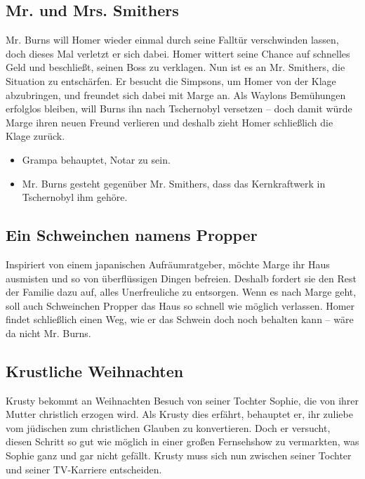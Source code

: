 \subsection{Mr. und Mrs. Smithers}\label{WABF03}
Mr. Burns will Homer wieder einmal durch seine Falltür verschwinden lassen, doch dieses Mal verletzt er sich dabei. Homer wittert seine Chance auf schnelles Geld und beschließt, seinen Boss zu verklagen. Nun ist es an Mr. Smithers, die Situation zu entschärfen. Er besucht die Simpsons, um Homer von der Klage abzubringen, und freundet sich dabei mit Marge an. Als Waylons Bemühungen erfolglos bleiben, will Burns ihn nach Tschernobyl versetzen -- doch damit würde Marge ihren neuen Freund verlieren und deshalb zieht Homer schließlich die Klage zurück.

\begin{itemize}
  \item Grampa behauptet, Notar zu sein.
  \item Mr. Burns gesteht gegenüber Mr. Smithers, dass das Kernkraftwerk in Tschernobyl ihm gehöre.
\end{itemize}

\subsection{Ein Schweinchen namens Propper}\label{WABF06}
Inspiriert von einem japanischen Aufräumratgeber, möchte Marge ihr Haus ausmisten und so von überflüssigen Dingen befreien. Deshalb fordert sie den Rest der Familie dazu auf, alles Unerfreuliche zu entsorgen. Wenn es nach Marge geht, soll auch Schweinchen Propper das Haus so schnell wie möglich verlassen. Homer findet schließlich einen Weg, wie er das Schwein doch noch behalten kann -- wäre da nicht Mr. Burns.


\subsection{Krustliche Weihnachten}\label{WABF02}
Krusty bekommt an Weihnachten Besuch von seiner Tochter Sophie, die von ihrer Mutter christlich erzogen wird. Als Krusty dies erfährt, behauptet er, ihr zuliebe vom jüdischen zum christlichen Glauben zu konvertieren. Doch er versucht, diesen Schritt so gut wie möglich in einer großen Fernsehshow zu vermarkten, was Sophie ganz und gar nicht gefällt. Krusty muss sich nun zwischen seiner Tochter und seiner TV-Karriere entscheiden.

